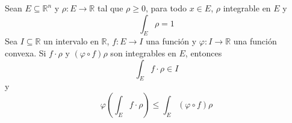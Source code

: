 \documentclass[12pt]{report}
\theoremstyle{largebreak}
\newcommand\cf[3]{\ensuremath{#1:#2\rightarrow#3}}
\begin{document}
    \begin{theor}
        Sean $E\subseteq\mathbb{R}^n$ y $\cf{\rho}{E}{\mathbb{R}}$ tal que $\rho\geq0$, para todo $x\in E$, $\rho$ integrable en $E$ y
        \begin{equation*}
            \int_E\rho=1
        \end{equation*}
        Sea $I\subseteq\mathbb{R}$ un intervalo en $\mathbb{R}$, $\cf{f}{E}{I}$ una función y $\cf{\varphi}{I}{\mathbb{R}}$ una función convexa. Si $f\cdot\rho$ y $(\varphi\circ f)\rho$ son integrables en $E$, entonces
        \begin{equation*}
            \int_{E}f\cdot\rho\in I
        \end{equation*}
        y
        \begin{equation*}
            \varphi\left(\int_{E}f\cdot\rho \right)\leq\int_E(\varphi\circ f)\rho
        \end{equation*}
    \end{theor}

    \renewcommand{\theenumi}{\arabic{enumi}}
\end{document}
